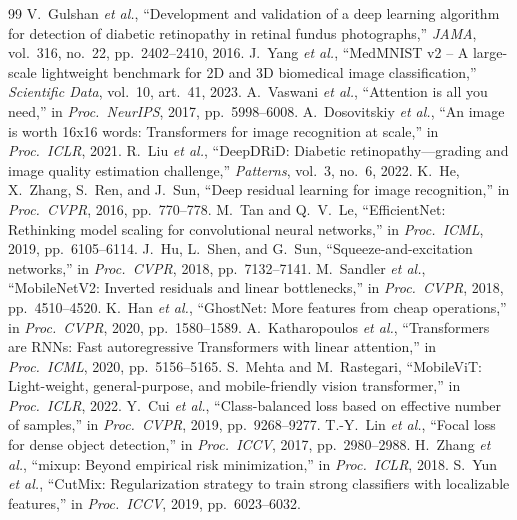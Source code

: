\documentclass[10pt,twocolumn]{article}
\begin{document}
\begingroup
\footnotesize
\setlength{\itemsep}{0pt}
\begin{thebibliography}{99}\setlength{\itemsep}{3pt}\setlength{\parsep}{0pt}
 V.~Gulshan \emph{et al.}, ``Development and validation of a deep learning algorithm for detection of diabetic retinopathy in retinal fundus photographs,'' \emph{JAMA}, vol.~316, no.~22, pp.~2402--2410, 2016.
 J.~Yang \emph{et al.}, ``MedMNIST v2 -- A large-scale lightweight benchmark for 2D and 3D biomedical image classification,'' \emph{Scientific Data}, vol.~10, art.~41, 2023.
 A.~Vaswani \emph{et al.}, ``Attention is all you need,'' in \emph{Proc.\ NeurIPS}, 2017, pp.~5998--6008.
 A.~Dosovitskiy \emph{et al.}, ``An image is worth 16x16 words: Transformers for image recognition at scale,'' in \emph{Proc.\ ICLR}, 2021.
 R.~Liu \emph{et al.}, ``DeepDRiD: Diabetic retinopathy---grading and image quality estimation challenge,'' \emph{Patterns}, vol.~3, no.~6, 2022.
 K.~He, X.~Zhang, S.~Ren, and J.~Sun, ``Deep residual learning for image recognition,'' in \emph{Proc.\ CVPR}, 2016, pp.~770--778.
 M.~Tan and Q.~V.~Le, ``EfficientNet: Rethinking model scaling for convolutional neural networks,'' in \emph{Proc.\ ICML}, 2019, pp.~6105--6114.
 J.~Hu, L.~Shen, and G.~Sun, ``Squeeze-and-excitation networks,'' in \emph{Proc.\ CVPR}, 2018, pp.~7132--7141.
 M.~Sandler \emph{et al.}, ``MobileNetV2: Inverted residuals and linear bottlenecks,'' in \emph{Proc.\ CVPR}, 2018, pp.~4510--4520.
 K.~Han \emph{et al.}, ``GhostNet: More features from cheap operations,'' in \emph{Proc.\ CVPR}, 2020, pp.~1580--1589.
 A.~Katharopoulos \emph{et al.}, ``Transformers are RNNs: Fast autoregressive Transformers with linear attention,'' in \emph{Proc.\ ICML}, 2020, pp.~5156--5165.
 S.~Mehta and M.~Rastegari, ``MobileViT: Light-weight, general-purpose, and mobile-friendly vision transformer,'' in \emph{Proc.\ ICLR}, 2022.
 Y.~Cui \emph{et al.}, ``Class-balanced loss based on effective number of samples,'' in \emph{Proc.\ CVPR}, 2019, pp.~9268--9277.
 T.-Y.~Lin \emph{et al.}, ``Focal loss for dense object detection,'' in \emph{Proc.\ ICCV}, 2017, pp.~2980--2988.
 H.~Zhang \emph{et al.}, ``mixup: Beyond empirical risk minimization,'' in \emph{Proc.\ ICLR}, 2018.
 S.~Yun \emph{et al.}, ``CutMix: Regularization strategy to train strong classifiers with localizable features,'' in \emph{Proc.\ ICCV}, 2019, pp.~6023--6032.

\end{thebibliography}
\end{document}
